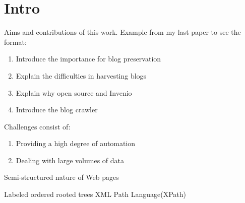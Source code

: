 \section{Intro}

Aims and contributions of this work. Example from my last paper to see the format:

\begin{enumerate}
  \item Introduce the importance for blog preservation
  \item Explain the difficulties in harvesting blogs
  \item Explain why open source and Invenio
  \item Introduce the blog crawler
\end{enumerate}

Challenges consist of:
\begin{enumerate}
  \item Providing a high degree of automation
  \item Dealing with large volumes of data
\end{enumerate}

Semi-structured nature of Web pages

Labeled ordered rooted trees
XML Path Language(XPath)
